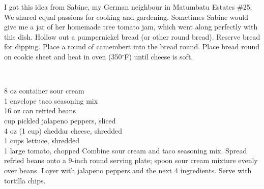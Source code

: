 \begin{minipage}{\linewidth}
\end{minipage}\par\begin{minipage}{\linewidth} 
I got this idea from Sabine, my German neighbour in Matumbatu Estates \#25. We shared equal passions for cooking and gardening. Sometimes Sabine would give me a jar of her homemade tree tomato jam, which went along perfectly with this dish.
Hollow out a pumpernickel bread (or other round bread). Reserve bread for dipping. Place a round of camembert into the bread round. Place bread round on cookie sheet and heat in oven (350$^\circ$F) until cheese is soft.

\end{minipage}\par\begin{minipage}{\linewidth} 
\\

\end{minipage}\par\begin{minipage}{\linewidth}   
	\step
	{8 oz container sour cream		\\
	 1 envelope taco seasoning mix	\\
	 16 oz can refried beans		\\
	  cup pickled jalapeno peppers, sliced	\\
	 4 oz (1 cup) cheddar cheese, shredded		\\
	 1  cups lettuce, shredded	\\
	 1 large tomato, chopped}
	{Combine sour cream and taco seasoning mix. Spread refried beans onto a 9-inch round serving plate; spoon sour cream mixture evenly over beans. Layer with jalapeno peppers and the next 4 ingredients. Serve with tortilla chips.
}


\end{minipage}
